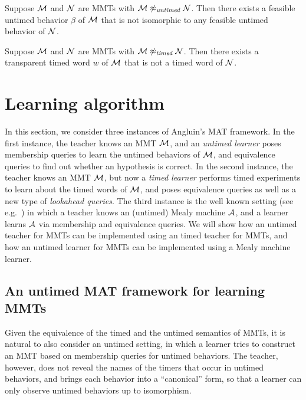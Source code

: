 \begin{lemma}
\label{not untimed}
Suppose ${\cal M}$ and ${\cal N}$ are MMTs with ${\cal M} \not\approx_{\mathit{untimed}} {\cal N}$.
Then there exists a feasible untimed behavior $\beta$ of ${\cal M}$ that is not isomorphic to any feasible untimed
behavior of ${\cal N}$.
\end{lemma}

\begin{lemma}
\label{not timed}
Suppose ${\cal M}$ and ${\cal N}$ are MMTs with ${\cal M} \not\approx_{\mathit{timed}} {\cal N}$.
Then there exists a transparent timed word $w$ of ${\cal M}$ that is not a timed word of ${\cal N}$.
\end{lemma}

\fi

\section{Learning algorithm}  
In this section, we consider three instances of Angluin's MAT framework.
In the first instance, the teacher knows an MMT ${\cal M}$, and an \emph{untimed learner} poses membership queries
to learn the untimed behaviors of ${\cal M}$, and equivalence queries to find out whether an hypothesis is correct.
In the second instance, the teacher knows an MMT ${\cal M}$, but now a 
\emph{timed learner} performs timed experiments to learn about the
timed words of ${\cal M}$, and poses equivalence queries as well as a new type of \emph{lookahead queries}.
The third instance is the well known setting (see e.g.\ \cite{Nie03,RSBM09}) 
in which a teacher knows an (untimed) Mealy machine ${\cal A}$,
and a learner learns ${\cal A}$ via membership and equivalence queries.
%
We will show how an untimed teacher for MMTs can be implemented using an timed teacher for MMTs,
and how an untimed learner for MMTs can be implemented using a Mealy machine learner.

\subsection{An untimed MAT framework for learning MMTs}
Given the equivalence of the timed and the untimed semantics of MMTs, it is natural to also 
consider an untimed setting, in which a learner tries to construct an MMT based on membership queries for untimed behaviors.
The teacher, however, does not reveal the names of the timers that occur in untimed behaviors, and brings each behavior into a
``canonical'' form, so that a learner can only observe untimed behaviors up to isomorphism.


